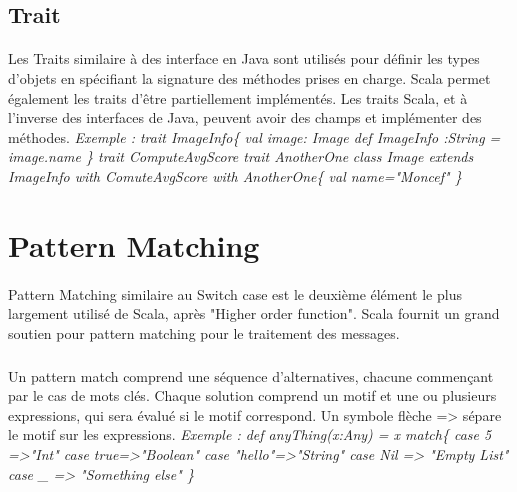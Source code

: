 \subsection{Trait}
\paragraph{}
Les Traits similaire à des interface en Java sont utilisés pour définir les types d'objets en spécifiant la signature des méthodes prises en charge. Scala permet également les traits d'être partiellement implémentés. Les traits Scala, et à l’inverse des interfaces de Java, peuvent avoir des champs et implémenter des méthodes.\newline
\textit{Exemple :    \newline
 trait ImageInfo\{
\newline
val image: Image
\newline
      def ImageInfo :String = image.name
\newline
\}
\newline
    trait ComputeAvgScore
\newline
    trait AnotherOne
}
\newline
\textit{
  class Image extends ImageInfo with ComuteAvgScore with AnotherOne\{
  \newline
      val name="Moncef"
  \newline\}}

\section{Pattern Matching}
\paragraph{}
Pattern Matching similaire au Switch case est le deuxième élément le plus largement utilisé de Scala, après "Higher order function". Scala fournit un grand soutien pour pattern matching pour le traitement des messages.
\subparagraph{}
Un pattern match comprend une séquence d'alternatives, chacune commençant par le cas de mots clés. Chaque solution comprend un motif et une ou plusieurs expressions, qui sera évalué si le motif correspond. Un symbole flèche => sépare le motif sur les expressions.
\newline
\textit{Exemple :
def anyThing(x:Any) = x match\{
\newline
case 5 =>"Int"
\newline
case true=>"Boolean"
\newline
case "hello"=>"String"
\newline
case Nil => "Empty List"
\newline
case \_ => "Something else"
\}}

